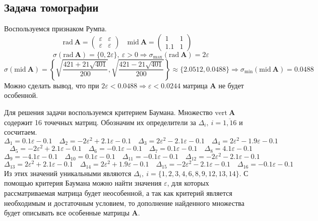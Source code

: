 \documentclass[a4paper]{article}
\begin{document}
\subsection{Задача томографии}
Воспользуемся признаком Румпа. 
\begin{equation*}
    \mathrm{rad}\:\mathbf{A}=\begin{pmatrix}
    \varepsilon&\varepsilon\\
    \varepsilon&\varepsilon
    \end{pmatrix}\quad
    \mathrm{mid}\:\mathbf{A}=\begin{pmatrix}
    1&1\\
    1.1&1
    \end{pmatrix}\quad
\end{equation*}
\begin{equation*}
    \sigma(\mathrm{rad}\:\mathbf{A})=\{0,2\varepsilon\},\:\varepsilon>0\Rightarrow\sigma_{\mathrm{max}}(\mathrm{rad}\:\mathbf{A})=2\varepsilon
\end{equation*}
\begin{equation*}
    \sigma(\mathrm{mid}\:\mathbf{A})=\left\{\sqrt{\frac{421+21\sqrt{401}}{200}},\sqrt{\frac{421-21\sqrt{401}}{200}}\right\}\approx\{2.0512, 0.0488\}\Rightarrow\sigma_{\mathrm{min}}(\mathrm{mid}\:\mathbf{A})=0.0488
\end{equation*}
Можно сделать вывод, что при $2\varepsilon<0.0488\Rightarrow\varepsilon<0.0244$ матрица $\mathbf{A}$ не будет особенной.

Для решения задачи воспользуемся критерием Баумана. Множество $\mathrm{vert}\:\mathbf{A}$ содержит 16 точечных матриц. Обозначим их определители за $\Delta_i,\:i=\overline{1,16}$ и сосчитаем.
\begin{equation*}
    \Delta_1=0.1\varepsilon-0.1\quad\Delta_2=-2\varepsilon^2+2.1\varepsilon-0.1\quad\Delta_3=2\varepsilon^2-2.1\varepsilon-0.1\quad\Delta_4=2\varepsilon^2-1.9\varepsilon-0.1
\end{equation*}
\begin{equation*}
    \Delta_5=-2\varepsilon^2+2.1\varepsilon-0.1\quad\Delta_6=-0.1\varepsilon-0.1\quad\Delta_7=0.1\varepsilon-0.1\quad\Delta_8=4.1\varepsilon-0.1
\end{equation*}
\begin{equation*}
    \Delta_9=-4.1\varepsilon-0.1\quad\Delta_{10}=0.1\varepsilon-0.1\quad\Delta_{11}=-0.1\varepsilon-0.1\quad\Delta_{12}=-2\varepsilon^2-2.1\varepsilon-0.1
\end{equation*}
\begin{equation*}
    \Delta_{13}=2\varepsilon^2+2.1\varepsilon-0.1\quad\Delta_{14}=2\varepsilon^2+1.9\varepsilon-0.1\quad\Delta_{15}=-2\varepsilon^2-2.1\varepsilon-0.1\quad\Delta_{16}=-0.1\varepsilon-0.1
\end{equation*}
Из этих значений уникальными являются $\Delta_i,\:i=\{1,2,3,4,6,8,9,12,13,14\}$. С помощью критерия Баумана можно найти значения $\varepsilon$, для которых рассматриваемая матрица будет неособенной, а так как критерий является необходимым и достаточным условием, то дополнение найденного множества будет описывать все особенные матрицы $\mathbf{A}$.
\end{document}
